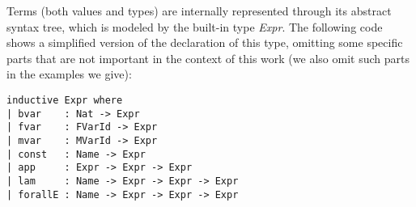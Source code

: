 Terms (both values and types) are internally represented through its abstract syntax tree, which is modeled by the built-in type \textit{Expr}. The following code shows a simplified version of the declaration of this type, omitting some specific parts that are not important in the context of this work (we also omit such parts in the examples we give):

\begin{verbatim}
inductive Expr where
| bvar    : Nat -> Expr
| fvar    : FVarId -> Expr
| mvar    : MVarId -> Expr
| const   : Name -> Expr
| app     : Expr -> Expr -> Expr
| lam     : Name -> Expr -> Expr -> Expr
| forallE : Name -> Expr -> Expr -> Expr
\end{verbatim}

